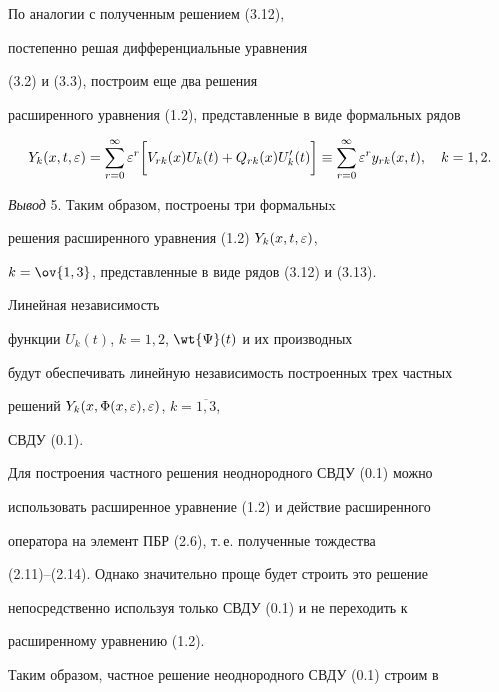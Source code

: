 По аналогии с полученным решением (3.12), 


постепенно решая дифференциальные уравнения


(3.2) и (3.3), построим еще два решения


расширенного уравнения (1.2), представленные в виде формальных рядов


\begin{equation}


Y_k (x, t, \e) = \sum \limits_{r=0}^{\infty} \e^r \biggl[ V_{rk}


(x) U_k (t) + Q_{rk} (x) U_k ' (t) \biggr] \equiv \sum


\limits_{r=0}^{\infty} \e^r y_{rk} (x,t), \quad k=1, 2.


\end{equation}





{\it Вывод} 5. Таким образом, построены три формальныx


решения расширенного уравнения (1.2) $Y_{k} (x,t, \varepsilon ) $,


$k=\ov{1,3}$, представленные в виде рядов (3.12) и (3.13).





Линейная независимость


функции $U_k (t)$, $k=1, 2$, $\wt{\Psi} (t)$ и их производных


будут обеспечивать линейную независимость построенных трех частных


решений $Y_k (x, \Phi(x, \varepsilon), \varepsilon)$, $k=\overline{1,3}$,


СВДУ (0.1).





Для построения частного решения неоднородного СВДУ (0.1) можно


использовать расширенное уравнение (1.2) и действие расширенного


оператора на элемент ПБР (2.6), т.\,е. полученные тождества


(2.11)--(2.14). Однако значительно проще будет строить это решение


непосредственно используя только СВДУ (0.1) и не переходить к


расширенному уравнению (1.2).





Таким образом, частное решение неоднородного СВДУ (0.1) строим в


